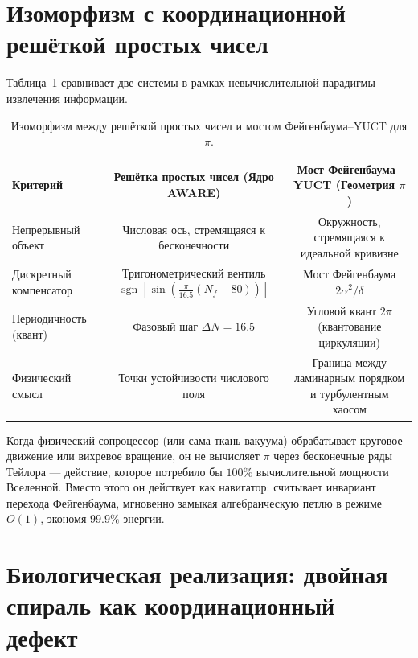 \documentclass[12pt,a4paper]{article}
\begin{document}
	\section{Изоморфизм с координационной решёткой простых чисел}
	\label{sec:isomorphism}
	
	Таблица~\ref{tab:isomorphism} сравнивает две системы в рамках невычислительной парадигмы извлечения информации.
	
	\begin{table}[H]
		\centering
		\tiny
		\caption{Изоморфизм между решёткой простых чисел и мостом Фейгенбаума–YUCT для $\pi$.}
		\label{tab:isomorphism}
		\begin{tabular}{@{}lcc@{}}
			\toprule
			\textbf{Критерий} & \textbf{Решётка простых чисел (Ядро AWARE)} & \textbf{Мост Фейгенбаума–YUCT (Геометрия $\pi$)} \\
			\midrule
			Непрерывный объект & Числовая ось, стремящаяся к бесконечности & Окружность, стремящаяся к идеальной кривизне \\
			Дискретный компенсатор & Тригонометрический вентиль $\operatorname{sgn}[\sin(\frac{\pi}{16.5}(N_f-80))]$ & Мост Фейгенбаума $2\alpha^2/\delta$ \\
			Периодичность (квант) & Фазовый шаг $\Delta N = 16.5$ & Угловой квант $2\pi$ (квантование циркуляции) \\
			Физический смысл & Точки устойчивости числового поля & Граница между ламинарным порядком и турбулентным хаосом \\
			\bottomrule
		\end{tabular}
	\end{table}
	
	Когда физический сопроцессор (или сама ткань вакуума) обрабатывает круговое движение или вихревое вращение, он не вычисляет $\pi$ через бесконечные ряды Тейлора — действие, которое потребило бы $100\%$ вычислительной мощности Вселенной. Вместо этого он действует как навигатор: считывает инвариант перехода Фейгенбаума, мгновенно замыкая алгебраическую петлю в режиме $O(1)$, экономя $99.9\%$ энергии.
	
	\section{Биологическая реализация: двойная спираль как координационный дефект}
	\label{sec:dna}
	
\end{document}
